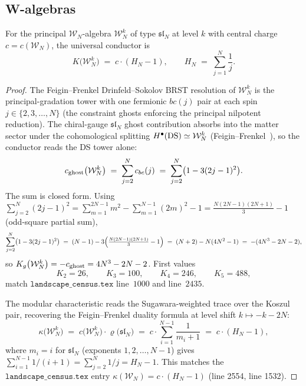 \subsection{W-algebras}
\label{subsec:climax17-wn}

\begin{proposition}[$K(\mathcal{W}_N^k)=c(H_N-1)$]
\label{prop:climax17-K-wn}
\ClaimStatusProvedHere
For the principal $\mathcal{W}_N$-algebra $\mathcal{W}_N^k$ of type
$\mathfrak{sl}_N$ at level $k$ with central charge $c=c(\mathcal{W}_N)$,
the universal conductor is
\[
  K\bigl(\mathcal{W}_N^k\bigr)\;=\;c\cdot(H_N-1),\qquad
  H_N\;=\;\sum_{j=1}^{N}\frac{1}{j}.
\]
\end{proposition}

\begin{proof}
The Feigin--Frenkel Drinfeld--Sokolov BRST resolution of
$\mathcal{W}_N^k$ is the principal-gradation tower with one fermionic
$bc(j)$ pair at each spin $j\in\{2,3,\ldots,N\}$ (the constraint
ghosts enforcing the principal nilpotent reduction). The chiral-gauge
$\mathfrak{sl}_N$ ghost contribution absorbs into the matter sector
under the cohomological splitting $H^\bullet(\mathrm{DS})\simeq\mathcal{W}_N^k$
(Feigin--Frenkel~\cite{FeiginFrenkel1990}), so the conductor reads the
DS tower alone:
\[
  c_{\mathrm{ghost}}\bigl(\mathcal{W}_N^k\bigr)
  \;=\;\sum_{j=2}^{N}c_{bc}(j)
  \;=\;\sum_{j=2}^{N}\bigl(1-3(2j-1)^2\bigr).
\]
The sum is closed form. Using $\sum_{j=2}^N(2j-1)^2
=\sum_{m=1}^{2N-1}m^2-\sum_{m=1}^{N-1}(2m)^2-1
=\tfrac{N(2N-1)(2N+1)}{3}-1$ (odd-square partial sum),
\[
  \sum_{j=2}^{N}\bigl(1-3(2j-1)^2\bigr)
  \;=\;(N-1)-3\Bigl(\tfrac{N(2N-1)(2N+1)}{3}-1\Bigr)
  \;=\;(N+2)-N(4N^2-1)
  \;=\;-(4N^3-2N-2),
\]
so $K_g\bigl(\mathcal{W}_N^k\bigr)=-c_{\mathrm{ghost}}=4N^3-2N-2$. First values
\[
  K_2=26,\qquad K_3=100,\qquad K_4=246,\qquad K_5=488,
\]
match $\texttt{landscape\_census.tex}$ line~$1000$ and line~$2435$.

The modular characteristic reads the Sugawara-weighted trace over the
Koszul pair, recovering the Feigin--Frenkel duality formula at
level shift $k\mapsto -k-2N$:
\begin{equation}
\label{eq:climax17-kappa-wn}
  \kappa\bigl(\mathcal{W}_N^k\bigr)
  \;=\;c\bigl(\mathcal{W}_N^k\bigr)\cdot\varrho\bigl(\mathfrak{sl}_N\bigr)
  \;=\;c\cdot\sum_{i=1}^{N-1}\frac{1}{m_i+1}
  \;=\;c\cdot(H_N-1),
\end{equation}
where $m_i=i$ for $\mathfrak{sl}_N$ (exponents $1,2,\ldots,N-1$) gives
$\sum_{i=1}^{N-1}1/(i+1)=\sum_{j=2}^{N}1/j=H_N-1$. This matches the
$\texttt{landscape\_census.tex}$ entry
$\kappa(\mathcal{W}_N)=c\cdot(H_N-1)$ (line 2554, line 1532).


\end{proof}
